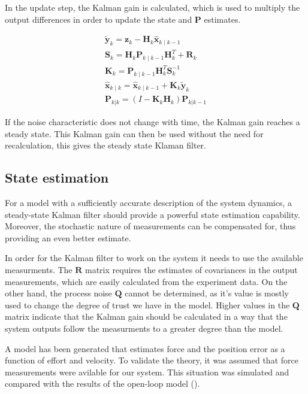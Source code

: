 In the update step, the Kalman gain is calculated, which is used to multiply the output differences in order to update the state and $\mathbf{P}$  estimates.

\begin{gather}
\tilde{\mathbf{y}}_k = \mathbf{z}_k - \mathbf{H}_k\hat{\mathbf{x}}_{k\mid k-1}\\
\mathbf{S}_k = \mathbf{H}_k \mathbf{P}_{k\mid k-1} \mathbf{H}_k^T + \mathbf{R}_k\\
\mathbf{K}_k = \mathbf{P}_{k\mid k-1}\mathbf{H}_k^T \mathbf{S}_k^{-1}\\
\hat{\mathbf{x}}_{k\mid k} = \hat{\mathbf{x}}_{k\mid k-1} + \mathbf{K}_k\tilde{\mathbf{y}}_k \\
\mathbf{P}_{k|k} = (I - \mathbf{K}_k \mathbf{H}_k) \mathbf{P}_{k|k-1} 
\end{gather}

If the noise characteristic does not change with time, the Kalman gain reaches a steady state.
This Kalman gain can then be used without the need for recalculation, this gives the steady state Klaman filter.

\subsection{State estimation}
For a model with a sufficiently accurate  description of the system dynamics, a steady-state Kalman filter should provide a powerful state estimation capability.
Moreover, the stochastic nature of measurements can be compensated for, thus providing an even better estimate.

In order for the Kalman filter to work on the system it needs to use the available measurments.
The $\mathbf{R}$ matrix requires the estimates of covariances in the output measurements, which are easily calculated from the experiment data.
On the other hand, the process noise $\mathbf{Q}$ cannot be determined, as it's value is mostly used to change the degree of trust we have in the model. 
Higher values in the $\mathbf{Q}$ matrix indicate that the Kalman gain should be calculated in a way that the system outputs follow the measurments to a greater degree than the model.

A model has been generated that estimates force and the position error as a function of effort and velocity.
To validate the theory, it was assumed that force measurements were avilable for our system.
This situation was simulated and compared with the results of the open-loop model ().

